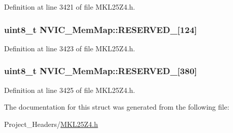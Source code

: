 Definition at line 3421 of file M\+K\+L25\+Z4.\+h.

\subsubsection[{\texorpdfstring{R\+E\+S\+E\+R\+V\+E\+D\+\_\+2}{RESERVED_2}}]{\setlength{\rightskip}{0pt plus 5cm}uint8\+\_\+t N\+V\+I\+C\+\_\+\+Mem\+Map\+::\+R\+E\+S\+E\+R\+V\+E\+D\+\_\mbox{[}124\mbox{]}}\hypertarget{struct_n_v_i_c___mem_map_a0ee42a0628832413d90ff77b050481f7}{}\label{struct_n_v_i_c___mem_map_a0ee42a0628832413d90ff77b050481f7}


Definition at line 3423 of file M\+K\+L25\+Z4.\+h.

\subsubsection[{\texorpdfstring{R\+E\+S\+E\+R\+V\+E\+D\+\_\+3}{RESERVED_3}}]{\setlength{\rightskip}{0pt plus 5cm}uint8\+\_\+t N\+V\+I\+C\+\_\+\+Mem\+Map\+::\+R\+E\+S\+E\+R\+V\+E\+D\+\_\mbox{[}380\mbox{]}}\hypertarget{struct_n_v_i_c___mem_map_ae5a29589e415fd83c840ca9b764be2d3}{}\label{struct_n_v_i_c___mem_map_ae5a29589e415fd83c840ca9b764be2d3}


Definition at line 3425 of file M\+K\+L25\+Z4.\+h.



The documentation for this struct was generated from the following file\+:\begin{DoxyCompactItemize}
\item 
Project\+\_\+\+Headers/\hyperlink{_m_k_l25_z4_8h}{M\+K\+L25\+Z4.\+h}\end{DoxyCompactItemize}
